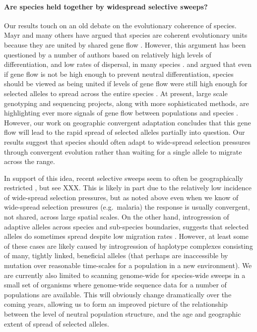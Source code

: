 \documentclass{article}
\begin{document}
\paragraph{Are species held together by widespread selective sweeps?}
Our results touch on an old debate on the evolutionary coherence of species. 
Mayr and many others have argued that species are coherent
evolutionary units because they are united by shared gene flow \citep[pages 521--522 ][]{Mayr:SpeciesEvol}. 
However, this argument has been questioned by a number of authors 
based on relatively high levels of differentiation, and low rates of dispersal, in many species \citep{EhrlichRaven:69,Levin:79}.
\citet{Rieseberg2001} and \citet{MorjanRieseberg:04} argued that 
even if gene flow is not be high enough to prevent neutral differentiation, 
species should be viewed as being united 
if levels of gene flow were still high enough for selected alleles to
spread across the entire species \citep[see also][]{Ellstrand2014s}.
At present, large scale genotyping and sequencing projects, 
along with more sophisticated methods, 
are highlighting ever more signals of gene flow between populations and species \citep{}.
However, our work on geographic convergent adaptation
\citep[see also][]{ralph2010parallel,RalphCoop:14} 
concludes that this gene flow will lead to the rapid spread of
selected alleles partially into question. 
Our results suggest that species should often adapt to
wide-spread selection pressures through convergent evolution rather
than waiting for a single allele to migrate across the range.
 
In support of this idea, recent selective sweeps seem to often be 
geographically restricted \citep{Coop}, but see XXX. 
This is likely in part due to the relatively low incidence of wide-spread selection pressures,
but as noted above even when we know of wide-spread selection
pressures (e.g.\ malaria) the response is usually convergent, not
shared, across large spatial scales. 
On the other hand, 
introgression of adaptive alleles across species and sub-species boundaries, 
suggests that selected alleles do sometimes spread despite low migration rates \citep{hedrick2013adaptive}.
However, at least some of these cases 
are likely caused by introgression of haplotype complexes
consisting of many, tightly linked, beneficial alleles (that perhaps
are inaccessible by mutation over reasonable time-scales for a population in a new
environment).  
We are currently also limited to scanning genome-wide for 
species-wide sweeps in a small set of organisms where genome-wide
sequence data for a number of populations are available. 
This will obviously change dramatically over the coming years,
allowing us to form an improved picture of the relationship between
the level of neutral population structure, and the age and geographic
extent of spread of selected alleles.
\end{document}
